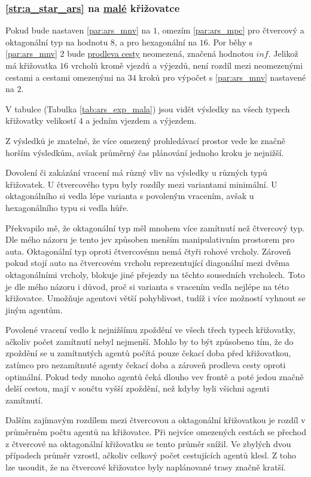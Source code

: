 \subsubsection{\ref{str:a_star_ars} na \hyperref[par:data_mala]{malé} křižovatce}
\label{subsubsec:exp_ars_mala_krizovatka}

Pokud bude nastaven \ref{par:ars_mnv} na $1$, omezím \ref{par:ars_mpc}
pro čtvercový a oktagonální typ na hodnotu $8$, a pro hexagonální na $16$.
Por běhy s \ref{par:ars_mnv} $2$ bude \hyperref[par:ars_mpc]{prodleva cesty} neomezená, značená hodnotou $inf$.
Jelikož má křižovatka $16$ vrcholů kromě vjezdů a výjezdů, není rozdíl mezi neomezenými cestami a
cestami omezenými na $34$ kroků pro výpočet s \ref{par:ars_mnv} nastavené na $2$.

V tabulce (Tabulka \ref{tab:ars_exp_mala}) jsou vidět výsledky na všech typech křižovatky
velikostí $4$ a jedním vjezdem a výjezdem.


Z výsledků je znatelné, že více omezený prohledávací prostor vede ke značně horším výsledkům,
avšak průměrný čas plánování jednoho kroku je nejnižší.

Dovolení či zakázání vracení má různý vliv na výsledky u různých typů křižovatek.
U čtvercového typu byly rozdíly mezi variantami minimální.
U oktagonálního si vedla lépe varianta s povoleným vracením, avšak u hexagonálního typu si vedla hůře.

Překvapilo mě, že oktagonální typ měl mnohem více zamítnutí než čtvercový typ.
Dle mého názoru je tento jev způsoben menším manipulativním prostorem pro auta.
Oktagonální typ oproti čtvercovému nemá čtyři rohové vrcholy.
Zároveň pokud stojí auto na čtvercovém vrcholu reprezentující diagonální mezi dvěma oktagonálními vrcholy,
blokuje jiné přejezdy na těchto sousedních vrcholech. %
Toto je dle mého názoru i důvod, proč si varianta s vracením vedla nejlépe na této křižovatce.
Umožňuje agentovi větší pohyblivost, tudíž i více možností vyhnout se jiným agentům.

Povolené vracení vedlo k nejnižšímu zpoždění ve všech třech typech křižovatky, ačkoliv počet zamítnutí nebyl nejmenší.
Mohlo by to být způsobeno tím, že do zpoždění se u zamítnutých agentů počítá pouze čekací doba před křižovatkou,
zatímco pro nezamítnuté agenty čekací doba a zároveň prodleva cesty oproti optimální.
Pokud tedy mnoho agentů čeká dlouho vev frontě a poté jedou značně delší cestou, mají v součtu vyšší zpoždění,
než kdyby byli všichni agenti zamítnutí.

Dalším zajímavým rozdílem mezi čtvercovou a oktagonální křižovatkou je rozdíl v průměrném počtu agentů na křižovatce.
Při nejvíce omezených cestách se přechod z čtvercové na oktagonální křižovatku se tento průměr snížil.
Ve zbylých dvou případech průměr vzrostl, ačkoliv celkový počet cestujících agentů klesl.
Z toho lze usoudit, že na čtvercové křižovatce byly naplánované trasy značně kratší.

